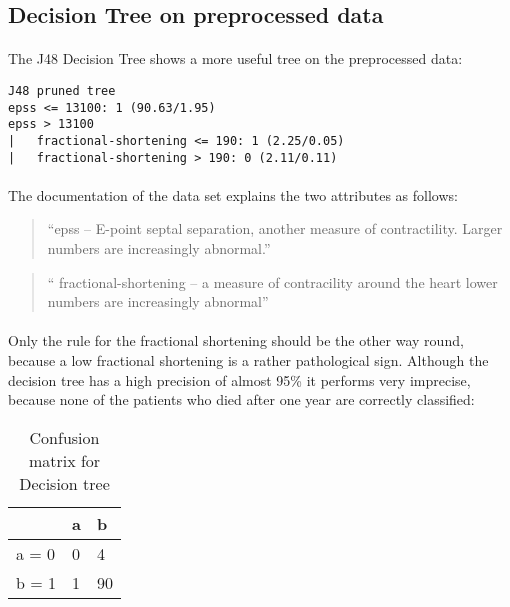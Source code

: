 \documentclass[paper=a4, fontsize=11pt]{scrartcl} %
\numberwithin{equation}{section} %
\numberwithin{figure}{section} %
\numberwithin{table}{section} %
\begin{document}
\subsection{Decision Tree on preprocessed data}

\paragraph{}The J48 Decision Tree shows a more useful tree on the preprocessed data:

\begin{lstlisting}
J48 pruned tree
epss <= 13100: 1 (90.63/1.95)
epss > 13100
|   fractional-shortening <= 190: 1 (2.25/0.05)
|   fractional-shortening > 190: 0 (2.11/0.11)
\end{lstlisting}

\paragraph{}The documentation of the data set explains the two attributes as follows:
\begin{quote}
``epss -- E-point septal separation, another measure of contractility. Larger numbers are increasingly abnormal.''
\end{quote}
\begin{quote}
`` fractional-shortening -- a measure of contracility around the heart lower numbers are increasingly abnormal''
\end{quote}

\paragraph{}Only the rule for the fractional shortening should be the other way round, because a low fractional shortening is a rather pathological sign. Although the decision tree has a high precision of almost 95\% it performs very imprecise, because none of the patients who died after one year are correctly classified:

\begin{table}[h]
\centering
\begin{tabular}{|l|ll|}
\hline
 & a &	b \\
\hline
a = 0  & 0 & 4 	\\
b = 1 & 1 & 90 	\\
\hline
\end{tabular}
\caption{Confusion matrix for Decision tree}
\end{table}
\end{document}
